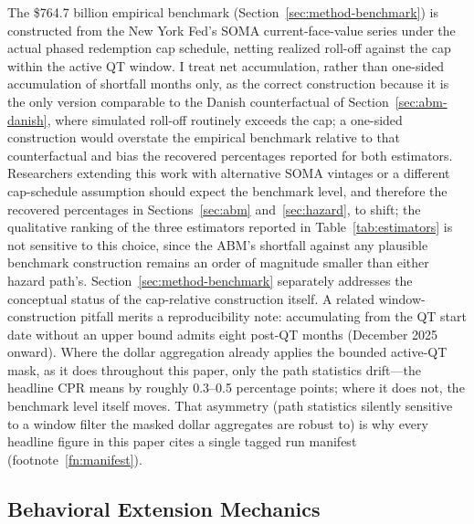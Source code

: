 \documentclass[12pt]{article}
\begin{document}
The \$764.7 billion empirical benchmark (Section~\ref{sec:method-benchmark}) is constructed from the New York Fed's SOMA current-face-value series under the actual phased redemption cap schedule, netting realized roll-off against the cap within the active QT window. I treat net accumulation, rather than one-sided accumulation of shortfall months only, as the correct construction because it is the only version comparable to the Danish counterfactual of Section~\ref{sec:abm-danish}, where simulated roll-off routinely exceeds the cap; a one-sided construction would overstate the empirical benchmark relative to that counterfactual and bias the recovered percentages reported for both estimators. Researchers extending this work with alternative SOMA vintages or a different cap-schedule assumption should expect the benchmark level, and therefore the recovered percentages in Sections~\ref{sec:abm} and~\ref{sec:hazard}, to shift; the qualitative ranking of the three estimators reported in Table~\ref{tab:estimators} is not sensitive to this choice, since the ABM's shortfall against any plausible benchmark construction remains an order of magnitude smaller than either hazard path's. Section~\ref{sec:method-benchmark} separately addresses the conceptual status of the cap-relative construction itself. A related window-construction pitfall merits a reproducibility note: accumulating from the QT start date without an upper bound admits eight post-QT months (December 2025 onward). Where the dollar aggregation already applies the bounded active-QT mask, as it does throughout this paper, only the path statistics drift---the headline CPR means by roughly 0.3--0.5 percentage points; where it does not, the benchmark level itself moves. That asymmetry (path statistics silently sensitive to a window filter the masked dollar aggregates are robust to) is why every headline figure in this paper cites a single tagged run manifest (footnote~\ref{fn:manifest}).

\subsection{Behavioral Extension Mechanics}\label{sec:robustness-extensions}
\end{document}
